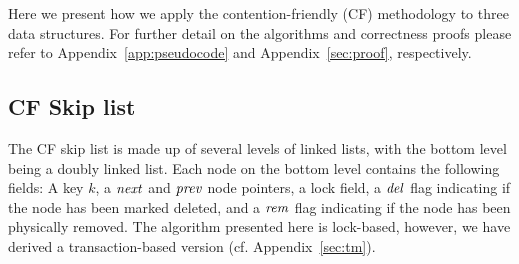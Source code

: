 Here we present how we apply the contention-friendly (CF) methodology to three data structures. For further detail on the algorithms and correctness proofs please refer to Appendix~\ref{app:pseudocode}
and Appendix~\ref{sec:proof}, respectively.



\subsection{CF Skip list}

The CF skip list is made up of several levels of linked lists,
with the bottom level being a doubly linked list.
Each node on the bottom level contains the following fields:
A key $k$, a $\ms{next}$ and $\ms{prev}$ node pointers, a lock field, a $\ms{del}$ flag indicating 
if the node has
been marked deleted, and a $\ms{rem}$ flag indicating if the node has been physically removed.
The algorithm presented here is lock-based, however, we have derived a transaction-based version
(cf. Appendix~\ref{sec:tm}).
%




